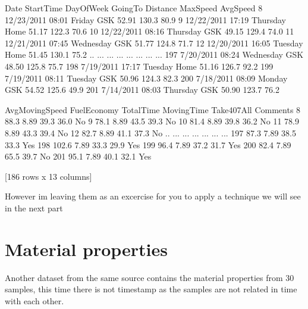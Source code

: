 \documentclass[letterpaper,10pt,english]{jupyterBook}
\begin{document}
\begin{sphinxVerbatim}[commandchars=\\\{\}]
           Date StartTime  DayOfWeek GoingTo  Distance  MaxSpeed  AvgSpeed  \PYGZbs{}
8    12/23/2011     08:01     Friday     GSK     52.91     130.3      80.9   
9    12/22/2011     17:19   Thursday    Home     51.17     122.3      70.6   
10   12/22/2011     08:16   Thursday     GSK     49.15     129.4      74.0   
11   12/21/2011     07:45  Wednesday     GSK     51.77     124.8      71.7   
12   12/20/2011     16:05    Tuesday    Home     51.45     130.1      75.2   
..          ...       ...        ...     ...       ...       ...       ...   
197   7/20/2011     08:24  Wednesday     GSK     48.50     125.8      75.7   
198   7/19/2011     17:17    Tuesday    Home     51.16     126.7      92.2   
199   7/19/2011     08:11    Tuesday     GSK     50.96     124.3      82.3   
200   7/18/2011     08:09     Monday     GSK     54.52     125.6      49.9   
201   7/14/2011     08:03   Thursday     GSK     50.90     123.7      76.2   

     AvgMovingSpeed  FuelEconomy  TotalTime  MovingTime Take407All Comments  
8              88.3         8.89       39.3        36.0         No           
9              78.1         8.89       43.5        39.3         No           
10             81.4         8.89       39.8        36.2         No           
11             78.9         8.89       43.3        39.4         No           
12             82.7         8.89       41.1        37.3         No           
..              ...          ...        ...         ...        ...      ...  
197            87.3         7.89       38.5        33.3        Yes           
198           102.6         7.89       33.3        29.9        Yes           
199            96.4         7.89       37.2        31.7        Yes           
200            82.4         7.89       65.5        39.7         No           
201            95.1         7.89       40.1        32.1        Yes           

[186 rows x 13 columns]
\end{sphinxVerbatim}

\sphinxAtStartPar
However im leaving them as an excercise for you to apply a technique we will see in the next part


\section{Material properties}
\label{\detokenize{c2_data_preparation/missing_data:material-properties}}
\sphinxAtStartPar
Another dataset from the same source contains the material properties from 30 samples, this time there is not timestamp as the samples are not related in time with each other.
\end{document}

